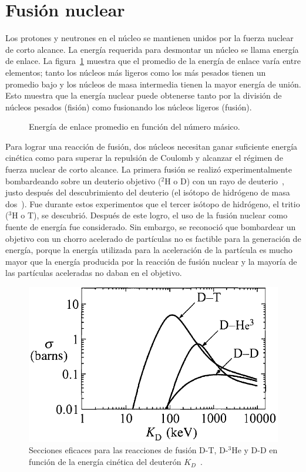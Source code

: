 \section{Fusión nuclear}\label{sec:fusion}
Los protones y neutrones en el núcleo se mantienen unidos por la fuerza nuclear de corto alcance. La energía
requerida para desmontar un núcleo se llama energía de enlace. La figura~\ref{fig:nucleons} muestra que el promedio
de la energía de enlace varía entre elementos; tanto los núcleos más ligeros como los más pesados tienen un promedio bajo
y los núcleos de masa intermedia tienen la mayor energía de unión.
Esto muestra que la energía nuclear puede obtenerse tanto por la división de núcleos pesados (fisión) como 
fusionando los núcleos ligeros (fusión).\par
\begin{figure}
    \centering
    \def\svgwidth{10cm}
    
    \caption[Energía de enlace]{Energía de enlace promedio en función del número másico.}
    \label{fig:nucleons}
\end{figure}
Para lograr una reacción de fusión, dos núcleos necesitan ganar suficiente energía cinética como para superar
la repulsión de Coulomb y alcanzar el régimen de fuerza nuclear de corto alcance. La primera fusión 
se realizó experimentalmente bombardeando sobre un deuterio
objetivo ($^2$H o D) con un rayo de deuterio~\cite{Oliphant1934}, justo después del descubrimiento del deuterio (el isótopo de hidrógeno de masa dos~\cite{PhysRev.40.1}).
Fue durante estos experimentos que el tercer isótopo de hidrógeno, el tritio ($^3$H o T),
se descubrió. Después de este logro, el uso de la fusión nuclear como fuente de energía fue
considerado. Sin embargo, se reconoció que bombardear un objetivo con un chorro acelerado de partículas 
no es factible para la generación de energía, porque la energía utilizada para la aceleración de la partícula
es mucho mayor que la energía producida por la reacción de fusión nuclear y la mayoría de
las partículas aceleradas no daban en el objetivo.\par
\begin{figure}
    \centering
    \includegraphics[scale=0.5]{img/fusion.png}
    \caption[Secciones eficaces en reacciones de fusión]{Secciones eficaces para las reacciones de fusión D-T, D-$^3$He y D-D en función de la energía cinética del deuterón $K_D$~\cite{Freidberg:1186225}.}
    \label{fig:fusion}
\end{figure}

